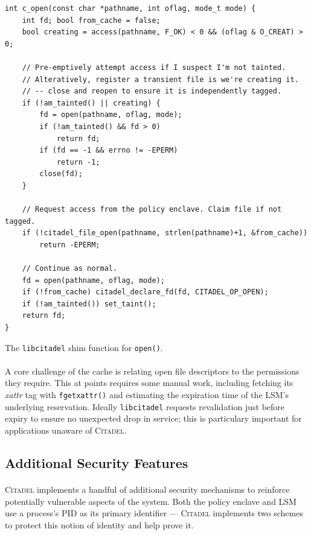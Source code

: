 \begin{listing}
\begin{verbatim}
int c_open(const char *pathname, int oflag, mode_t mode) {
    int fd; bool from_cache = false;
    bool creating = access(pathname, F_OK) < 0 && (oflag & O_CREAT) > 0;
    
    // Pre-emptively attempt access if I suspect I'm not tainted.
    // Alteratively, register a transient file is we're creating it.
    // -- close and reopen to ensure it is independently tagged.
    if (!am_tainted() || creating) {
        fd = open(pathname, oflag, mode);
        if (!am_tainted() && fd > 0)
            return fd;
        if (fd == -1 && errno != -EPERM)
            return -1;
        close(fd);
    }

    // Request access from the policy enclave. Claim file if not tagged.
    if (!citadel_file_open(pathname, strlen(pathname)+1, &from_cache))
        return -EPERM;

    // Continue as normal.
    fd = open(pathname, oflag, mode);
    if (!from_cache) citadel_declare_fd(fd, CITADEL_OP_OPEN);
    if (!am_tainted()) set_taint();
    return fd;
}
\end{verbatim}
\caption{The \texttt{libcitadel} shim function for \texttt{open()}.}
\label{lst:c_open}
\end{listing}

\paragraph{} A core challenge of the cache is relating open file descriptors to the permissions they require. This at points requires some manual work, including fetching its \textit{xattr} tag with \texttt{fgetxattr()} and estimating the expiration time of the LSM's underlying reservation. Ideally \texttt{libcitadel} requests revalidation just before expiry to ensure no unexpected drop in service; this is particulary important for applications unaware of \textsc{Citadel}.


\subsection{Additional Security Features}
\paragraph{} \textsc{Citadel} implements a handful of additional security mechanisms to reinforce potentially vulnerable aspects of the system. Both the policy enclave and LSM use a process's PID as its primary identifier --- \textsc{Citadel} implements two schemes to protect this notion of identity and help prove it.

